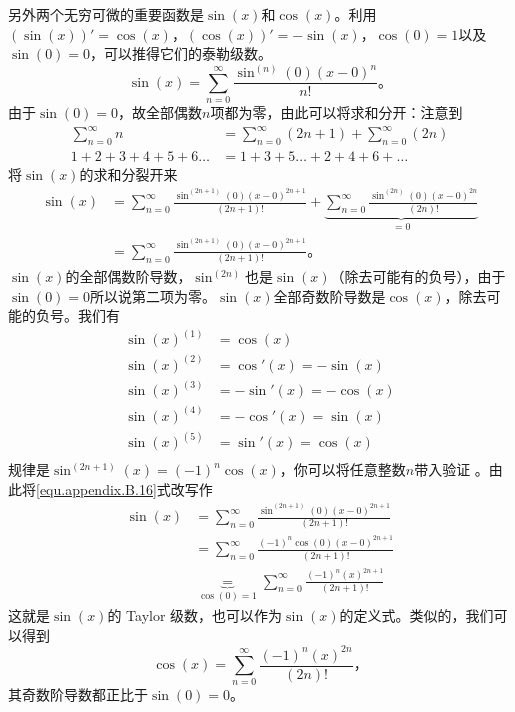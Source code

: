另外两个无穷可微的重要函数是$\sin(x)$和$\cos(x)$。利用$(\sin(x))'=\cos(x)$，$(\cos(x))'=-\sin(x)$，$\cos(0)=1$以及$\sin(0)=0$，可以推得它们的泰勒级数。
\begin{equation*}
\sin(x) = \sum\limits_{n=0}^\infty \frac{\sin^{(n)}(0)(x-0)^n}{n!}\text{。}
\end{equation*}
由于$\sin(0)=0$，故全部偶数$n$项都为零，由此可以将求和分开：注意到
\begin{equation}
\begin{aligned}
\sum_{n=0}^{\infty}n &= \sum_{n=0}^\infty (2n+1) + \sum_{n=0}^\infty (2n) \\
1+2+3+4+5+6\dots &= 1+3+5\dots + 2+4+6+\dots
\end{aligned}
\end{equation}
将$\sin(x)$的求和分裂开来
\begin{equation}
\begin{aligned}
\sin(x) &= \sum\limits_{n=0}^\infty \frac{\sin^{(2n+1)}(0)(x-0)^{2n+1}}{(2n+1)!}+ \underbrace{\sum\limits_{n=0}^\infty \frac{\sin^{(2n)}(0)(x-0)^{2n}}{(2n)!}}_{=0} \\
 &= \sum\limits_{n=0}^\infty \frac{\sin^{(2n+1)}(0)(x-0)^{2n+1}}{(2n+1)!}\text{。}
\end{aligned}
\label{equ.appendix.B.16}
\end{equation}
$\sin(x)$的全部偶数阶导数，$\sin^{(2n)}$也是$\sin(x)$（除去可能有的负号），由于$\sin(0)=0$所以说第二项为零。$\sin(x)$全部奇数阶导数是$\cos(x)$，除去可能的负号。我们有
\begin{equation}
\begin{aligned}
\sin(x)^{(1)}&=\cos(x) \\
\sin(x)^{(2)}&=\cos'(x)=-\sin(x) \\
\sin(x)^{(3)}&=-\sin'(x)=-\cos(x) \\
\sin(x)^{(4)}&=-\cos'(x)=\sin(x) \\
\sin(x)^{(5)}&=\sin'(x)=\cos(x) \\
\end{aligned}
\end{equation}
规律是$\sin^{(2n+1)}(x)=(-1)^n\cos(x)$，你可以将任意整数$n$带入验证%
%
。由此将\ref{equ.appendix.B.16}式改写作
\begin{equation}
\begin{aligned}
\sin(x) &= \sum\limits_{n=0}^{\infty}\frac{\sin^{(2n+1)}(0)(x-0)^{2n+1}}{(2n+1)!} \\
&= \sum\limits_{n=0}^{\infty}\frac{(-1)^n\cos(0)(x-0)^{2n+1}}{(2n+1)!} \\
&\underbrace{=}_{\cos(0)=1} \sum\limits_{n=0}^\infty \frac{(-1)^n(x)^{2n+1}}{(2n+1)!}
\end{aligned}
\label{equ.appendix.B.18}
\end{equation}
这就是$\sin(x)$的 Taylor 级数，也可以作为$\sin(x)$的定义式。类似的，我们可以得到
\begin{equation}
\cos(x)= \sum\limits_{n=0}^{\infty}\frac{(-1)^n(x)^{2n}}{(2n)!}\text{，}
\label{equ.appendix.B.19}
\end{equation}
其奇数阶导数都正比于$\sin(0)=0$。

